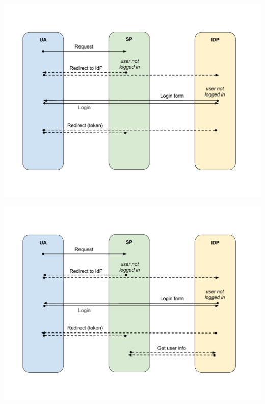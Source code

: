 \documentclass[ignorenonframetext,aspectratio=169]{beamer}
\begin{document}
\begin{frame}[plain]
\centering
\includegraphics[height=\paperheight]{fedsso-proto-4.pdf}
\end{frame}

\begin{frame}[plain]
\centering
\includegraphics[height=\paperheight]{fedsso-proto-5.pdf}
\end{frame}
\end{document}

